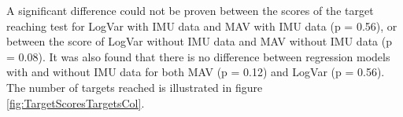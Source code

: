 \begin{multicols}{2}
%
%	
%

	
	A significant difference could not be proven between the scores of the target reaching test for LogVar with IMU data and MAV with IMU data (p = 0.56), or between the score of LogVar without IMU data and MAV without IMU data (p = 0.08). It was also found that there is no difference between regression models with and without IMU data for both MAV (p = 0.12) and LogVar (p = 0.56). The number of targets reached is illustrated in figure \ref{fig:TargetScoresTargetsCol}.
	
	
		\begin{center}
			\label{tab:averageNoTR}
		\end{center}
	

\end{multicols}
